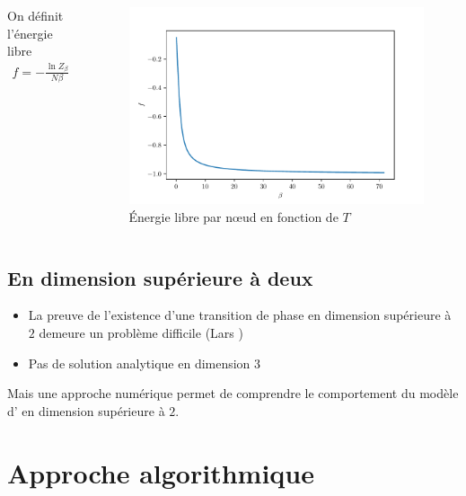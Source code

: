 \documentclass[french]{beamer}
\begin{document}
\begin{frame}
\begin{columns}[c]
	On définit l'énergie libre
	\begin{align*}
		f = - \frac{\ln Z_\beta}{N \beta}
	\end{align*}
    \vspace*{-1.5cm}
\begin{figure}
	\centering
	\includegraphics[height=0.65\textheight]{assets/Elibre}
	\caption{\'Energie libre par n\oe{}ud en fonction de $T$}
	\label{fig:elibre}
\end{figure}
\end{columns}
\end{frame}

%
\subsection{En dimension supérieure à deux}
%

\begin{frame}
    \begin{itemize}
        \item La preuve de l'existence d'une transition de phase en dimension supérieure à $2$ demeure un problème difficile (Lars )
        \item Pas de solution analytique en dimension $3$
    \end{itemize}
    Mais une approche numérique permet de comprendre le comportement du modèle d' en dimension supérieure à $2$.
\end{frame}

\section{Approche algorithmique}
\end{document}
